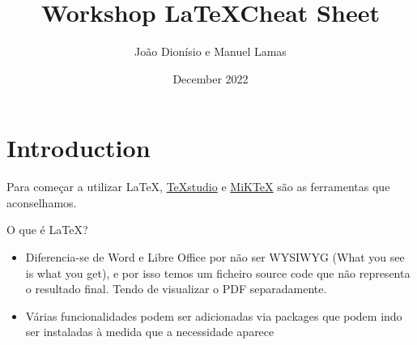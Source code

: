 \documentclass[10pt]{article}
\title{Workshop \LaTeX Cheat Sheet}
\author{João Dionísio e Manuel Lamas}
\date{December 2022}
\begin{document}
\maketitle

\section{Introduction}

Para começar a utilizar LaTeX, \href{https://www.texstudio.org/}{TeXstudio} e \href{https://miktex.org/}{MiKTeX} são as ferramentas que aconselhamos.

O que é \LaTeX?
\begin{itemize}
    \item Diferencia-se de Word e Libre Office por não ser WYSIWYG (What you see is what you get), e por isso temos um ficheiro source code que não representa o resultado final. Tendo de visualizar o PDF separadamente.
    \item Várias funcionalidades podem ser adicionadas via packages que podem indo ser instaladas à medida que a necessidade aparece
\end{itemize}
\end{document}
